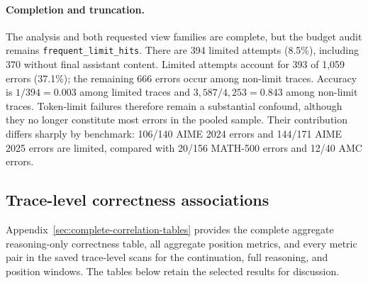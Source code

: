 \paragraph{Completion and truncation.}
The analysis and both requested view families are complete, but the budget
audit remains \texttt{frequent\_limit\_hits}. There are 394 limited attempts
(8.5\%), including 370 without final assistant content. Limited attempts
account for 393 of 1,059 errors (37.1\%); the remaining 666 errors occur among
non-limit traces. Accuracy is $1/394=0.003$ among limited traces and
$3,587/4,253=0.843$ among non-limit traces. Token-limit failures therefore
remain a substantial confound, although they no longer constitute most
errors in the pooled sample. Their contribution differs sharply by benchmark:
106/140 AIME 2024 errors and 144/171 AIME 2025 errors are limited, compared
with 20/156 MATH-500 errors and 12/40 AMC errors.

\subsection{Trace-level correctness associations}

Appendix~\ref{sec:complete-correlation-tables} provides the complete aggregate
reasoning-only correctness table, all aggregate position metrics, and every
metric pair in the saved trace-level scans for the continuation, full reasoning,
and position windows. The tables below retain the selected results for discussion.

